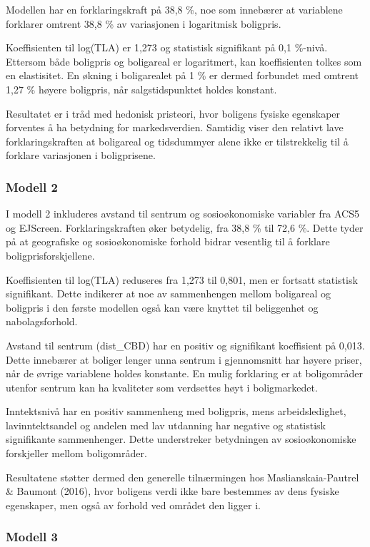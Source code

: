 \documentclass[
  norsk,
  a4paper,
]{article}
\begin{document}
Modellen har en forklaringskraft på 38,8 \%, noe som innebærer at
variablene forklarer omtrent 38,8 \% av variasjonen i logaritmisk
boligpris.

Koeffisienten til log(TLA) er 1,273 og statistisk signifikant på 0,1
\%-nivå. Ettersom både boligpris og boligareal er logaritmert, kan
koeffisienten tolkes som en elastisitet. En økning i boligarealet på 1
\% er dermed forbundet med omtrent 1,27 \% høyere boligpris, når
salgstidspunktet holdes konstant.

Resultatet er i tråd med hedonisk pristeori, hvor boligens fysiske
egenskaper forventes å ha betydning for markedsverdien. Samtidig viser
den relativt lave forklaringskraften at boligareal og tidsdummyer alene
ikke er tilstrekkelig til å forklare variasjonen i boligprisene.

\subsubsection{Modell 2}\label{modell-2-1}

I modell 2 inkluderes avstand til sentrum og sosioøkonomiske variabler
fra ACS5 og EJScreen. Forklaringskraften øker betydelig, fra 38,8 \% til
72,6 \%. Dette tyder på at geografiske og sosioøkonomiske forhold bidrar
vesentlig til å forklare boligprisforskjellene.

Koeffisienten til log(TLA) reduseres fra 1,273 til 0,801, men er
fortsatt statistisk signifikant. Dette indikerer at noe av sammenhengen
mellom boligareal og boligpris i den første modellen også kan være
knyttet til beliggenhet og nabolagsforhold.

Avstand til sentrum (dist\_CBD) har en positiv og signifikant
koeffisient på 0,013. Dette innebærer at boliger lenger unna sentrum i
gjennomsnitt har høyere priser, når de øvrige variablene holdes
konstante. En mulig forklaring er at boligområder utenfor sentrum kan ha
kvaliteter som verdsettes høyt i boligmarkedet.

Inntektsnivå har en positiv sammenheng med boligpris, mens
arbeidsledighet, lavinntektsandel og andelen med lav utdanning har
negative og statistisk signifikante sammenhenger. Dette understreker
betydningen av sosioøkonomiske forskjeller mellom boligområder.

Resultatene støtter dermed den generelle tilnærmingen hos
Maslianskaia-Pautrel \& Baumont (2016), hvor boligens verdi ikke bare
bestemmes av dens fysiske egenskaper, men også av forhold ved området
den ligger i.

\subsubsection{Modell 3}\label{modell-3-1}
\end{document}
